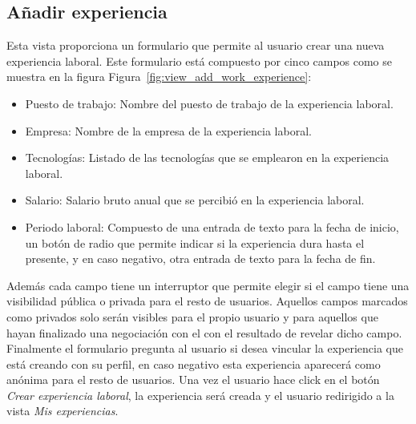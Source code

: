 \documentclass[a4paper, 12pt]{book}
\begin{document}
    \subsection{Añadir experiencia}
    \label{subsec:view_add_work_experience}
    Esta vista proporciona un formulario que permite al usuario crear una nueva experiencia laboral.
    Este formulario está compuesto por cinco campos como se muestra en la figura Figura~\ref{fig:view_add_work_experience}:
    \begin{itemize}
        \item Puesto de trabajo: Nombre del puesto de trabajo de la experiencia laboral.
        \item Empresa: Nombre de la empresa de la experiencia laboral.
        \item Tecnologías: Listado de las tecnologías que se emplearon en la experiencia laboral.
        \item Salario: Salario bruto anual que se percibió en la experiencia laboral.
        \item Periodo laboral: Compuesto de una entrada de texto para la fecha de inicio, un botón de radio que permite indicar si la experiencia dura hasta el presente, y en caso negativo, otra entrada de texto para la fecha de fin.
    \end{itemize}
    Además cada campo tiene un interruptor que permite elegir si el campo tiene una visibilidad pública o privada para el resto de usuarios. Aquellos campos marcados como privados solo serán visibles para el propio usuario y para aquellos que hayan finalizado una negociación con el con el resultado de revelar dicho campo.
    Finalmente el formulario pregunta al usuario si desea vincular la experiencia que está creando con su perfil, en caso negativo esta experiencia aparecerá como anónima para el resto de usuarios.
    Una vez el usuario hace click en el botón \emph{Crear experiencia laboral}, la experiencia será creada y el usuario redirigido a la vista \emph{Mis experiencias}.
\end{document}
